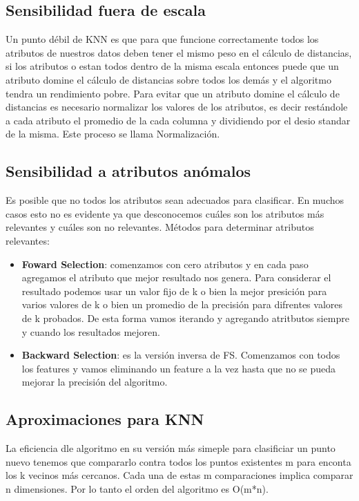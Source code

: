 \documentclass[titlepage,a4paper]{article}
\begin{document}
\subsection*{Sensibilidad fuera de escala}
 Un punto débil de KNN  es que para que funcione correctamente todos los atributos de nuestros datos deben tener el mismo peso en el cálculo de distancias, si los atributos o estan todos dentro de la misma escala entonces puede que un atributo domine el cálculo de distancias sobre todos los demás y el algoritmo tendra un rendimiento pobre. Para evitar que un atributo domine el cálculo de distancias es necesario normalizar los valores de los atributos, es decir restándole a cada atributo el promedio de la cada columna y dividiendo por el desio standar de la misma. Este proceso se llama Normalización. \\
 
 \subsection*{Sensibilidad a atributos anómalos}
 Es posible que no todos los atributos sean adecuados para clasificar. En muchos casos esto no es evidente ya que desconocemos cuáles son los atributos más relevantes y cuáles son no relevantes. Métodos para determinar atributos relevantes:  
 \begin{itemize}
 \item\textbf{ Foward Selection}: comenzamos con cero atributos y en cada paso agregamos el atributo que mejor resultado nos genera. Para considerar el resultado podemos usar un valor fijo de k o bien la mejor presición para varios valores de k o bien un promedio de la precisión para difrentes valores de k probados. De esta forma vamos iterando y agregando atritbutos siempre y cuando los resultados mejoren.
 \item \textbf{Backward Selection}: es la versión inversa de FS. Comenzamos con todos los features y vamos eliminando un feature a la vez hasta que no se pueda mejorar la precisión del algoritmo. 
 \end{itemize}
 
 \subsection*{Aproximaciones para KNN}
 La eficiencia dle algoritmo en su versión más simeple para clasificiar un punto nuevo tenemos que compararlo contra todos los puntos existentes m para enconta los k vecinos más cercanos. Cada una de estas m comparaciones implica comparar n dimensiones. Por lo tanto el orden del algoritmo es O(m*n). 
\\
\end{document}
